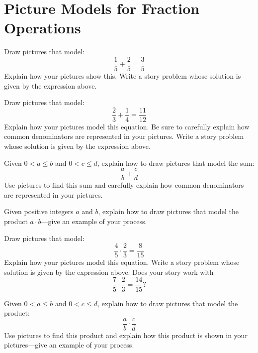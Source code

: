 \newpage
\section{Picture Models for Fraction Operations}\label{A:FO}
\begin{prob} 
Draw pictures that model:
\[
\frac{1}{5} + \frac{2}{5} = \frac{3}{5}
\]
Explain how your pictures show this. Write a story problem whose
solution is given by the expression above.
\end{prob}

\begin{prob} 
Draw pictures that model:
\[
\frac{2}{3} + \frac{1}{4} = \frac{11}{12}
\]
Explain how your pictures model this equation. Be sure to carefully
explain how common denominators are represented in your
pictures. Write a story problem whose solution is given by the
expression above.
\end{prob}

\begin{prob} 
Given $0<a\le b$ and $0<c\le d$, explain how to draw pictures
that model the sum:
\[
\frac{a}{b} + \frac{c}{d}
\]
Use pictures to find this sum and carefully explain how common
denominators are represented in your pictures.
\end{prob}

\begin{prob} 
Given positive integers $a$ and $b$, explain how to draw pictures that
model the product $a\cdot b$---give an example of your process.
\end{prob}

\begin{prob} 
Draw pictures that model:
\[
\frac{4}{5} \cdot \frac{2}{3} = \frac{8}{15}
\]
Explain how your pictures model this equation. Write a story problem
whose solution is given by the expression above. Does your story work with 
\[
\frac{7}{5} \cdot \frac{2}{3} = \frac{14}{15}?
\]
\end{prob}

\begin{prob} 
Given $0<a\le b$ and $0<c\le d$, explain how to draw pictures
that model the product:
\[
\frac{a}{b} \cdot \frac{c}{d}
\]
Use pictures to find this product and explain how this product is shown
in your pictures---give an example of your process.
\end{prob}
